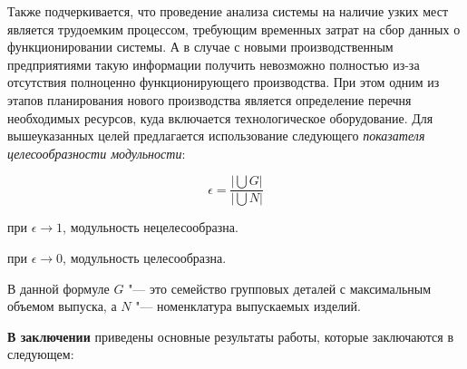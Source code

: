 Также подчеркивается, что проведение анализа системы на наличие узких мест является трудоемким процессом, требующим временных затрат на сбор данных о функционировании системы. А в случае с новыми производственным предприятиями такую информации получить невозможно полностью из-за отсутствия полноценно функционирующего производства. При этом одним из этапов планирования нового производства является определение перечня необходимых ресурсов, куда включается технологическое оборудование. Для вышеуказанных целей предлагается использование следующего \textit{показателя целесообразности модульности}:

\[
\epsilon = \frac{\big|\bigcup G \big|}{\big|\bigcup N \big|}
\]


\noindent при $\epsilon \rightarrow 1$, модульность нецелесообразна.

\noindent при $\epsilon \rightarrow 0$, модульность целесообразна.   

В данной формуле $G$ "--- это семейство групповых деталей с максимальным объемом выпуска, а $N$ "--- номенклатура выпускаемых изделий.

\FloatBarrier                      
\textbf{В заключении} приведены основные результаты работы, которые заключаются в следующем:


